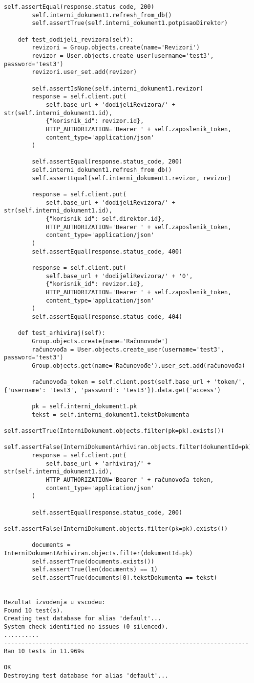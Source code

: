 \begin{lstlisting}[breaklines=true]
		self.assertEqual(response.status_code, 200)
		self.interni_dokument1.refresh_from_db()
		self.assertTrue(self.interni_dokument1.potpisaoDirektor)
		
	def test_dodijeli_revizora(self):
		revizori = Group.objects.create(name='Revizori')
		revizor = User.objects.create_user(username='test3', password='test3')
		revizori.user_set.add(revizor)
		
		self.assertIsNone(self.interni_dokument1.revizor)
		response = self.client.put(
			self.base_url + 'dodijeliRevizora/' + str(self.interni_dokument1.id),
			{"korisnik_id": revizor.id},
			HTTP_AUTHORIZATION='Bearer ' + self.zaposlenik_token,
			content_type='application/json'
		)
		
		self.assertEqual(response.status_code, 200)
		self.interni_dokument1.refresh_from_db()
		self.assertEqual(self.interni_dokument1.revizor, revizor)
		
		response = self.client.put(
			self.base_url + 'dodijeliRevizora/' + str(self.interni_dokument1.id),
			{"korisnik_id": self.direktor.id},
			HTTP_AUTHORIZATION='Bearer ' + self.zaposlenik_token,
			content_type='application/json'
		)
		self.assertEqual(response.status_code, 400)
		
		response = self.client.put(
			self.base_url + 'dodijeliRevizora/' + '0',
			{"korisnik_id": revizor.id},
			HTTP_AUTHORIZATION='Bearer ' + self.zaposlenik_token,
			content_type='application/json'
		)
		self.assertEqual(response.status_code, 404)
		
	def test_arhiviraj(self):
		Group.objects.create(name='Računovođe')
		računovođa = User.objects.create_user(username='test3', password='test3')
		Group.objects.get(name='Računovođe').user_set.add(računovođa)
		
		računovođa_token = self.client.post(self.base_url + 'token/', {'username': 'test3', 'password': 'test3'}).data.get('access')
		
		pk = self.interni_dokument1.pk
		tekst = self.interni_dokument1.tekstDokumenta
		self.assertTrue(InterniDokument.objects.filter(pk=pk).exists())
		self.assertFalse(InterniDokumentArhiviran.objects.filter(dokumentId=pk).exists())
		response = self.client.put(
			self.base_url + 'arhiviraj/' + str(self.interni_dokument1.id),
			HTTP_AUTHORIZATION='Bearer ' + računovođa_token,
			content_type='application/json'
		)

		self.assertEqual(response.status_code, 200)
		self.assertFalse(InterniDokument.objects.filter(pk=pk).exists())
		
		documents = InterniDokumentArhiviran.objects.filter(dokumentId=pk)
		self.assertTrue(documents.exists())
		self.assertTrue(len(documents) == 1)
		self.assertTrue(documents[0].tekstDokumenta == tekst)
		
		
Rezultat izvođenja u vscodeu:
Found 10 test(s).
Creating test database for alias 'default'...
System check identified no issues (0 silenced).
..........
----------------------------------------------------------------------
Ran 10 tests in 11.969s

OK
Destroying test database for alias 'default'...
\end{lstlisting}
			
